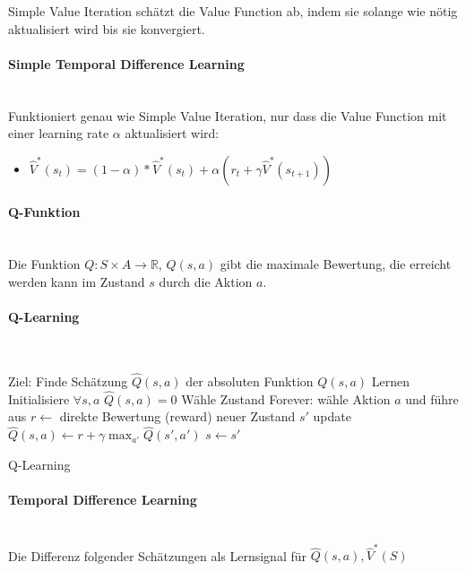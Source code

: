 Simple Value Iteration schätzt die Value Function ab, indem sie solange wie nötig
aktualisiert wird bis sie konvergiert.

\paragraph{Simple Temporal Difference Learning} \mbox{} \\
Funktioniert genau wie Simple Value Iteration, nur dass die
Value Function mit einer learning rate $\alpha$ aktualisiert wird:\\
\begin{itemize}
    \item $\hat{V}^{*}(s_t) = (1-\alpha) * \hat{V}^{*}(s_t)+\alpha(r_t + \gamma \hat{V}^{*}(s_{t+1}))$
\end{itemize}
\paragraph{Q-Funktion} \mbox{} \\
Die Funktion $Q : S \times A \rightarrow \mathbb{R}$, $Q(s,a)$ gibt die maximale
Bewertung, die erreicht werden kann im Zustand $s$ durch die Aktion $a$.
\paragraph{Q-Learning} \mbox{} \\
\begin{algorithm}
\begin{algorithmic}
    \State Ziel: Finde Schätzung $\hat{Q}(s,a)$ der absoluten Funktion $Q(s,a)$
    \State Lernen
    \State Initialisiere $\forall s,a$ $\hat{Q}(s,a) = 0$
    \State Wähle Zustand
    \While{} Forever:
        \State wähle Aktion $a$ und führe aus
        \State $r \leftarrow$ direkte Bewertung (reward)
        \State neuer Zustand $s'$
        \State update
        \IndState $\hat{Q}(s,a) \leftarrow r + \gamma \max_{a'} \hat{Q}(s',a')$
        \State $s\leftarrow s'$
        \EndWhile
    \caption{Q-Learning}
\end{algorithmic}

\end{algorithm}

\paragraph{Temporal Difference Learning}\mbox {} \\
Die Differenz folgender Schätzungen als Lernsignal für $\hat{Q}(s,a), \hat{V}^{*}(S)$

